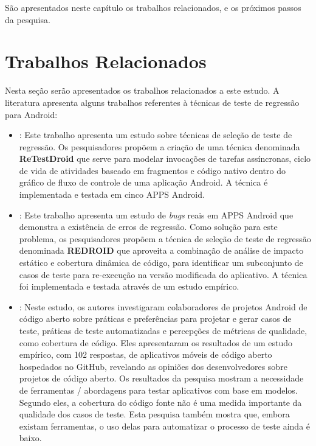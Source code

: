 \acresetall
São apresentados neste capítulo os trabalhos relacionados, e os próximos passos da pesquisa.%

\section{Trabalhos Relacionados}

Nesta seção serão apresentados os trabalhos relacionados a este estudo. A literatura apresenta alguns trabalhos referentes à técnicas de teste de regressão para Android:

\begin{itemize}
    
    \item \cite{8377661}: Este trabalho apresenta um estudo sobre técnicas de seleção de teste de regressão. Os pesquisadores propõem a criação de uma técnica denominada \textbf{ReTestDroid} que serve para modelar invocações de tarefas assíncronas, ciclo de vida de atividades baseado em fragmentos e código nativo dentro do gráfico de fluxo de controle de uma aplicação Android. A técnica é implementada e testada em cinco \ac{APPS} Android.
    
    \item \cite{Do2016RedroidAR}: Este trabalho apresenta um estudo de \textit{bugs} reais em \ac{APPS} Android que demonstra a existência de erros de regressão. Como solução para este problema, os pesquisadores propõem a técnica de seleção de teste de regressão denominada \textbf{REDROID} que aproveita a combinação de análise de impacto estático e cobertura dinâmica de código, para identificar um subconjunto de casos de teste para re-execução na versão modificada do aplicativo. A técnica foi implementada e testada através de um estudo empírico.
    
    \item \cite{8094467}: Neste estudo, os autores investigaram colaboradores de projetos Android de código aberto sobre práticas e preferências para projetar e gerar casos de teste, práticas de teste automatizadas e percepções de métricas de qualidade, como cobertura de código. Eles apresentaram os resultados de um estudo empírico, com 102 respostas, de aplicativos móveis de código aberto hospedados no GitHub, revelando as opiniões dos desenvolvedores sobre projetos de código aberto. Os resultados da pesquisa mostram a necessidade de ferramentas / abordagens para testar aplicativos com base em modelos. Segundo eles, a cobertura do código fonte não é uma medida importante da qualidade dos casos de teste. Esta pesquisa também mostra que, embora existam ferramentas, o uso delas para automatizar o processo de teste ainda é baixo.
    

\end{itemize}
